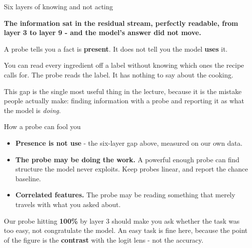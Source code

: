 \documentclass[aspectratio=169]{beamer}
\newcommand{\keybox}[1]{%
  \begin{tcolorbox}[colback=armblue!8, colframe=armblue, boxrule=0.6pt, arc=2pt]
  #1
  \end{tcolorbox}}
\newcommand{\trapbox}[1]{%
  \begin{tcolorbox}[colback=armred!8, colframe=armred, boxrule=0.6pt, arc=2pt]
  #1
  \end{tcolorbox}}
\newcommand{\watchbox}[1]{%
  \begin{tcolorbox}[colback=armorange!12, colframe=armorange, boxrule=0.6pt, arc=2pt]
  #1
  \end{tcolorbox}}
\begin{document}
\begin{frame}{Six layers of knowing and not acting}
  \vspace{1.0em}
  \trapbox{\textbf{The information sat in the residual stream, perfectly readable, from layer 3
  to layer 9 - and the model's answer did not move.}}

  \vspace{1.0em}
  \keybox{A probe tells you a fact is \textbf{present}. It does not tell you the model
  \textbf{uses} it.}

  \vspace{1.0em}
  You can read every ingredient off a label without knowing which ones the recipe calls for. The
  probe reads the label. It has nothing to say about the cooking.

  \vspace{0.9em}
  {\footnotesize This gap is the single most useful thing in the lecture, because it is the
  mistake people actually make: finding information with a probe and reporting it as what the
  model is \emph{doing}.}
\end{frame}

\begin{frame}{How a probe can fool you}
  \vspace{0.5em}
  \begin{itemize}
    \item \textbf{Presence is not use} - the six-layer gap above, measured on our own data.
    \item \textbf{The probe may be doing the work.} A powerful enough probe can find structure
      the model never exploits. Keep probes linear, and report the chance baseline.
    \item \textbf{Correlated features.} The probe may be reading something that merely travels
      with what you asked about.
  \end{itemize}

  \vspace{0.8em}
  \watchbox{Our probe hitting \textbf{100\%} by layer 3 should make you ask whether the task was
  too easy, not congratulate the model. An easy task is fine here, because the point of the
  figure is the \textbf{contrast} with the logit lens - not the accuracy.}
\end{frame}
\end{document}
